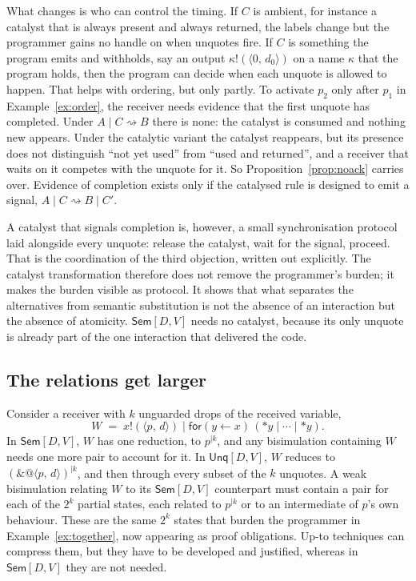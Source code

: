 \documentclass[11pt,a4paper]{article}
\makeatletter
\theoremstyle{plain}
\theoremstyle{definition}
\theoremstyle{remark}
\newcommand{\pr}[2]{\langle #1,\,#2\rangle}
\newcommand{\qn}[2]{@\langle #1,\,#2\rangle}
\newcommand{\out}[2]{#1!(#2)}
\newcommand{\rcv}[3]{\mathsf{for}(#1 \leftarrow #2)\,#3}
\newcommand{\drop}[1]{{*}#1}
\newcommand{\unq}[1]{\mathop{\&}#1}
\newcommand{\red}{\rightsquigarrow}
\newcommand{\Sem}{\textsf{Sem}[D,V]}
\newcommand{\Unq}{\textsf{Unq}[D,V]}
\makeatother
\begin{document}
What changes is who can control the timing. If $C$ is ambient, for instance a
catalyst that is always present and always returned, the labels change but the
programmer gains no handle on when unquotes fire. If $C$ is something the
program emits and withholds, say an output $\out{\kappa}{\pr{0}{d_0}}$ on a
name $\kappa$ that the program holds, then the program can decide when each
unquote is allowed to happen. That helps with ordering, but only partly.
To activate $p_2$ only after $p_1$ in Example~\ref{ex:order}, the receiver
needs evidence that the first unquote has completed. Under $A\mid C\red B$
there is none: the catalyst is consumed and nothing new appears. Under the
catalytic variant the catalyst reappears, but its presence does not
distinguish ``not yet used'' from ``used and returned'', and a receiver that
waits on it competes with the unquote for it. So
Proposition~\ref{prop:noack} carries over. Evidence of completion exists only
if the catalysed rule is designed to emit a signal, $A\mid C\red B\mid C'$.

A catalyst that signals completion is, however, a small synchronisation
protocol laid alongside every unquote: release the catalyst, wait for the
signal, proceed. That is the coordination of the third objection, written out
explicitly. The catalyst transformation therefore does not remove the
programmer's burden; it makes the burden visible as protocol. It shows that
what separates the alternatives from semantic substitution is not the absence
of an interaction but the absence of atomicity. $\Sem$ needs no catalyst,
because its only unquote is already part of the one interaction that
delivered the code.

\subsection{The relations get larger}

Consider a receiver with $k$ unguarded drops of the received variable,
\[
  W \;=\; \out{x}{\pr{p}{d}}\mid\rcv{y}{x}{(\drop{y}\mid\cdots\mid\drop{y})}.
\]
In $\Sem$, $W$ has one reduction, to $p^{\mid k}$, and any bisimulation
containing $W$ needs one more pair to account for it. In $\Unq$, $W$ reduces
to $(\unq{\qn{p}{d}})^{\mid k}$, and then through every subset of the $k$
unquotes. A weak bisimulation relating $W$ to its $\Sem$ counterpart must
contain a pair for each of the $2^k$ partial states, each related to
$p^{\mid k}$ or to an intermediate of $p$'s own behaviour. These are the same
$2^k$ states that burden the programmer in Example~\ref{ex:together}, now
appearing as proof obligations. Up-to techniques can compress them, but
they have to be developed and justified, whereas in $\Sem$ they are not
needed.
\end{document}
